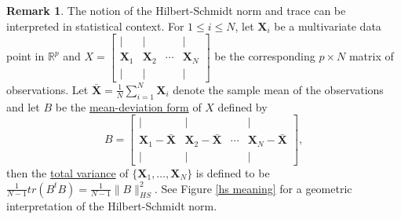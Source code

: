 \documentclass[12pt,letterpaper]{book}
\numberwithin{equation}{section}
\theoremstyle{definition}
\newtheorem{remark}[thm]{\textbf{Remark}}
\begin{document}
\begin{remark}\label{trace variance} The notion of the Hilbert-Schmidt norm and trace can be interpreted in statistical context. For $1\leq i \leq N$, let $\bm{X}_i$ be a multivariate data point in $\mathbb{R}^p$ and $X=\left[\begin{array}{cccc} | & | &   & | \\ \bm{X}_1 & \bm{X}_2 & \cdots & \bm{X}_N \\ | & | &  & | \end{array}\right]$ be the corresponding $p\times N$  matrix of observations. Let $\bar{\bm{X}}=\frac{1}{N}\sum_{i=1}^N \bm{X}_i$ denote the sample mean of the observations and let $B$ be the \underline{mean-deviation form} of $X$ defined by
$$B=\left[\begin{array}{cccc} | & | &   & | \\ \bm{X}_1-\bar{\bm{X}} & \bm{X}_2-\bar{\bm{X}} & \cdots & \bm{X}_N-\bar{\bm{X}} \\ | & | &  & | \end{array}\right],$$
then the \underline{total variance} of $\{\bm{X}_1,\ldots, \bm{X}_N\}$ is defined to be $\frac{1}{N-1}tr(B^tB)=\frac{1}{N-1}\|B\|^2_{HS}$. See Figure \ref{hs meaning} for a geometric interpretation of the Hilbert-Schmidt norm.
\end{remark}
\end{document}
